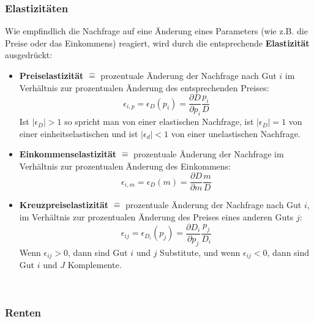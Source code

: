 \subsubsection*{Elastizitäten}

Wie empfindlich die Nachfrage auf eine Änderung eines Parameters (wie z.B. die Preise oder das Einkommens) reagiert, wird durch die entsprechende \textbf{Elastizität} ausgedrückt:
\begin{itemize}
	\item \textbf{Preiselastizität} $\hat{=}$ prozentuale Änderung der Nachfrage nach Gut $i$ im Verhältnis zur prozentualen Änderung des entsprechenden Preises: 
	$$ \epsilon_{i, p} = \epsilon_D(p_i) = \frac{\partial D}{\partial p_i} \frac{p_i}{D} $$
	Ist $|\epsilon_D| > 1$ so spricht man von einer elastischen Nachfrage, ist $|\epsilon_D| = 1$ von einer einheitselastischen und ist $|\epsilon_d| < 1$ von einer unelastischen Nachfrage.
	\item \textbf{Einkommenselastizität} $\hat{=}$ prozentuale Änderung der Nachfrage im Verhältnis zur prozentualen Änderung des Einkommens: $$ \epsilon_{i, m} = \epsilon_D(m) = \frac{\partial D}{\partial m} \frac{m}{D} $$
	\item \textbf{Kreuzpreiselastizität} $\hat{=}$ prozentuale Änderung der Nachfrage  nach Gut $i$, im Verhältnis zur prozentualen Änderung des Preises eines anderen Guts $j$: 
	$$ \epsilon_{ij} = \epsilon_{D_i}(p_j) = \frac{\partial D_i}{\partial p_j} \frac{p_j}{D_i} $$
	Wenn $\epsilon_{ij} > 0$, dann sind Gut $i$ und $j$ Substitute, und wenn $\epsilon_{ij} < 0$, dann sind Gut $i$ und $J$ Komplemente.
\end{itemize} ~\smallskip

\subsubsection*{Renten}

